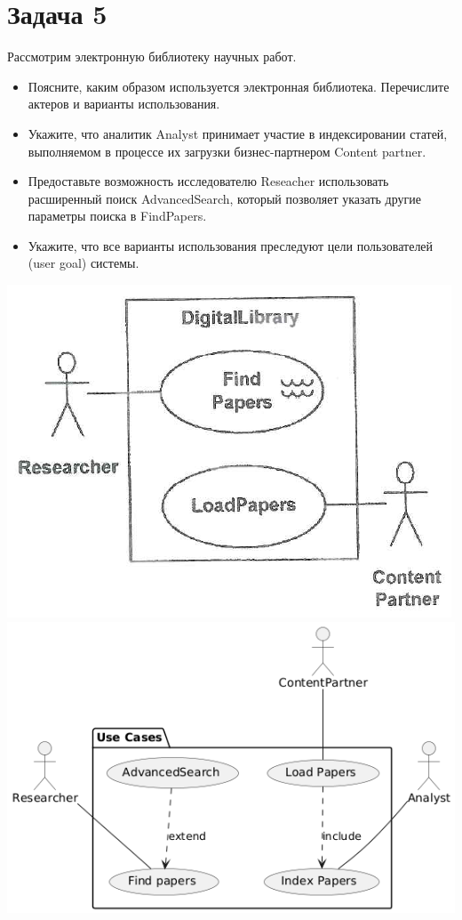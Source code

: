\documentclass{article}
\begin{document}
\section{Задача 5}
Рассмотрим электронную библиотеку научных работ.

\begin{itemize}
    \item Поясните, каким образом используется электронная библиотека. Перечислите актеров и варианты использования.
    \item Укажите, что аналитик Analyst принимает участие в индексировании статей, выполняемом в процессе их загрузки бизнес-партнером Content partner.
    \item Предоставьте возможность исследователю Reseacher использовать расширенный поиск AdvancedSearch, который позволяет указать другие параметры поиска в FindPapers.
    \item Укажите, что все варианты использования преследуют цели пользователей (user goal) системы.
\end{itemize}

\includegraphics[width=\textwidth]{task5.png}
\includegraphics[width=\textwidth]{5.png}
\end{document}
